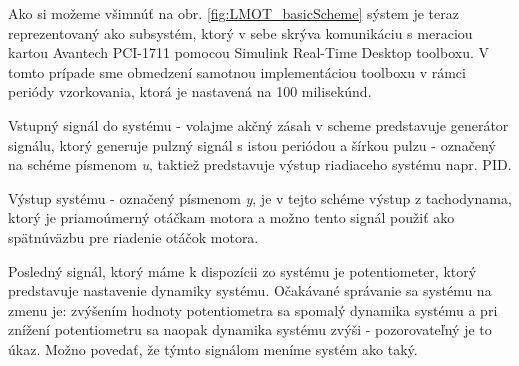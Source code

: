 \documentclass[a4paper, 10pt, ]{article}
\begin{document}
Ako si možeme všimnúť na obr. \ref{fig:LMOT_basicScheme} sýstem je teraz reprezentovaný ako subsystém, ktorý v sebe skrýva komunikáciu s meraciou kartou Avantech PCI-1711 pomocou Simulink Real-Time Desktop toolboxu. V tomto prípade sme obmedzení samotnou implementáciou toolboxu v rámci periódy vzorkovania, ktorá je nastavená na 100 milisekúnd.

Vstupný signál do systému - volajme akčný zásah v scheme predstavuje generátor signálu, ktorý generuje pulzný signál s istou periódou a šírkou pulzu - označený na schéme písmenom \emph{u}, taktiež predstavuje výstup riadiaceho systému napr. PID.

Výstup systému - označený písmenom \emph{y}, je v tejto schéme výstup z tachodynama, ktorý je priamoúmerný otáčkam motora a možno tento signál použiť ako spätnúväzbu pre riadenie otáčok motora.

Posledný signál, ktorý máme k dispozícii zo systému je potentiometer, ktorý predstavuje nastavenie dynamiky systému. Očakávané správanie sa systému na zmenu je: zvýšením hodnoty potentiometra sa spomalý dynamika systému a pri znížení potentiometru sa naopak dynamika systému zvýši - pozorovateľný je to úkaz. Možno povedať, že týmto signálom meníme systém ako taký.









\end{document}

